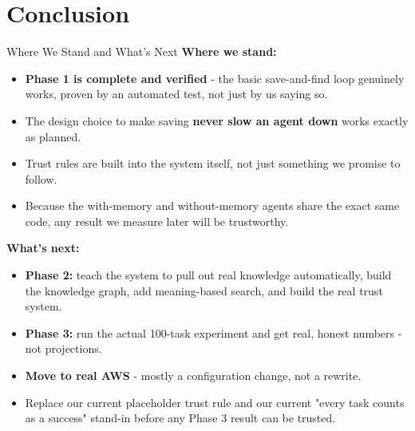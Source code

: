 \documentclass{beamer}
\begin{document}
\section{Conclusion}
\begin{frame}{Where We Stand and What's Next}
    \textbf{Where we stand:}
    \begin{itemize}
        \item \textbf{Phase 1 is complete and verified} - the basic save-and-find loop genuinely works, proven by an automated test, not just by us saying so.
        \item The design choice to make saving \textbf{never slow an agent down} works exactly as planned.
        \item Trust rules are built into the system itself, not just something we promise to follow.
        \item Because the with-memory and without-memory agents share the exact same code, any result we measure later will be trustworthy.
    \end{itemize}

    \vspace{0.25cm}
    \textbf{What's next:}
    \begin{itemize}
        \item \textbf{Phase 2:} teach the system to pull out real knowledge automatically, build the knowledge graph, add meaning-based search, and build the real trust system.
        \item \textbf{Phase 3:} run the actual 100-task experiment and get real, honest numbers - not projections.
        \item \textbf{Move to real AWS} - mostly a configuration change, not a rewrite.
        \item Replace our current placeholder trust rule and our current "every task counts as a success" stand-in before any Phase 3 result can be trusted.
    \end{itemize}
\end{frame}

\end{document}
